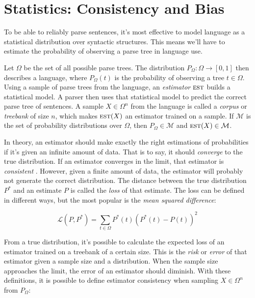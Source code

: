 \section{Statistics: Consistency and Bias}\label{sec:Statistics}


To be able to reliably parse sentences, it's most effective to model language as a statistical distribution over syntactic structures. This means we'll have to estimate the probability of observing a parse tree in language use. 

Let $\Omega$ be the set of all possible parse trees. The distribution $P_\Omega: \Omega\rightarrow [0,1]$ then describes a language, where $P_\Omega(t)$ is the probability of observing a tree $t \in \Omega$. Using a sample of parse trees from the language, an \emph{estimator} $\textsc{est}$ builds a statistical model. A parser then uses that statistical model to predict the correct parse tree of sentences.
A sample $X \in \Omega^n$ from the language is called a \emph{corpus} or \emph{treebank} of size $n$, which makes $\textsc{est}(X)$ an estimator trained on a sample. If $\mathcal{M}$ is the set of probability distributions over $\Omega$, then $P_\Omega \in \mathcal{M}$ and $\textsc{est}(X) \in \mathcal{M}$.

In theory, an estimator should make exactly the right estimations of probabilities if it's given an infinite amount of data. That is to say, it should \emph{converge} to the true distribution. If an estimator converges in the limit, that estimator is \emph{consistent} \cite{zollmann2005}.
However, given a finite amount of data, the estimator will probably not generate the correct distribution. The distance between the true distribution $P^*$ and an estimate $P$ is called the \emph{loss} of that estimate. The loss can be defined in different ways, but the most popular is the \emph{mean squared difference}:

$$ \mathcal{L}(P, P^*) =  \sum_{t \in \Omega} P^*(t) (P^*(t)-P(t))^2$$

From a true distribution, it's possible to calculate the expected loss of an estimator trained on a treebank of a certain size. This is the \emph{risk} or \emph{error} of that estimator given a sample size and a distribution. 
When the sample size approaches the limit, the error of an estimator should diminish. With these definitions, it is possible to define estimator consistency when sampling $X \in \Omega^n$ from $P_\Omega$:

